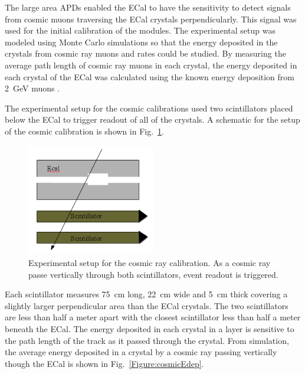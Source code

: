 The large area APDs enabled the ECal to have the sensitivity to detect signals from cosmic muons traversing the ECal crystals perpendicularly. This signal was used for the initial calibration of the modules. The experimental setup was modeled using Monte Carlo simulations so that the energy deposited in the crystals from cosmic ray muons and rates could be studied. By measuring the average path length of cosmic ray muons in each crystal, the energy deposited in each crystal of the ECal was calculated using the known energy deposition from 2~GeV muons \cite{Agashe:2014kda}. 

The experimental setup for the cosmic calibrations used two scintillators placed below the ECal to trigger readout of all of the crystals. A schematic for the setup of the cosmic calibration is shown in Fig.~\ref{Figure:cosmicScheme}.


\begin{figure}[H]
  \centering
      \includegraphics[width=0.5\textwidth]{pics/performance/cosmicschematic.png}
  \caption[Setup for ECal cosmic ray calibration]{Experimental setup for the cosmic ray calibration. As a cosmic ray passe vertically through both scintillators, event readout is triggered.}
  \label{Figure:cosmicScheme}
\end{figure}

Each scintillator measures 75~cm long, 22~cm wide and 5~cm thick covering a slightly larger perpendicular area than the ECal crystals. The two scintillators are less than half a meter apart with the closest scintillator less than half a meter beneath the ECal. The energy deposited in each crystal in a layer is sensitive to the path length of the track as it passed through the crystal. From simulation, the average energy deposited in a crystal by a cosmic ray passing vertically though the ECal is shown in Fig.~\ref{Figure:cosmicEdep}.

